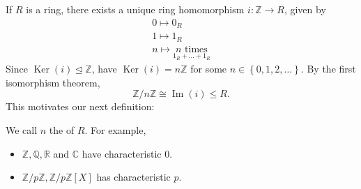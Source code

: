 \documentclass[egregdoesnotlikesansseriftitles,a4paper]{scrartcl}
\begin{document}
If $R$ is a ring, there exists a unique ring homomorphism $i: \mathbb{Z} \rightarrow R$, given by 
\begin{align*}
      0 \mapsto 0_{R}\\
      1 \mapsto 1_{R}\\
      n \mapsto \underset{1_{R}+\ldots+1_{R}}{n \text{ times}} 
\end{align*}
Since $\operatorname{Ker}\left(i\right)\unlhd \mathbb{Z}$, have $\operatorname{Ker}\left(i\right)=n\mathbb{Z}$ for some $n \in \left\{0,1,2,\ldots \right\}$. By the first isomorphism theorem, \[
\mathbb{Z}/n\mathbb{Z} \cong \operatorname{Im} \left(i\right) \leq R
.\] This motivates our next definition:
\begin{definition*}[Characteristic]
       We call $n$ the  of $R$. For example,
       \begin{itemize}
             \item $\mathbb{Z},\mathbb{Q},\mathbb{R}$ and $\mathbb{C}$ have characteristic 0. 
             \item $\mathbb{Z}/p\mathbb{Z}, \mathbb{Z}/p\mathbb{Z}[X]$ has characteristic $p$.
       \end{itemize}
\end{definition*}
\end{document}
